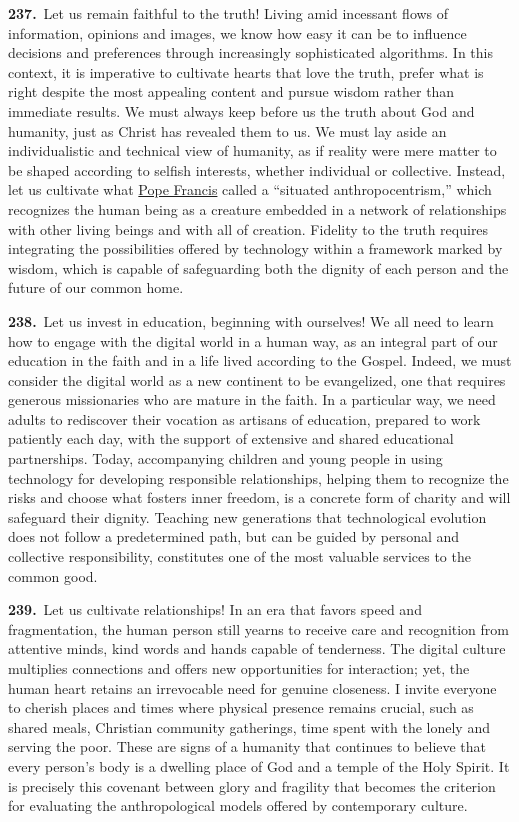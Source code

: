 \documentclass{article}
\begin{document}
\textbf{237.}\ Let us remain faithful to the truth! Living amid incessant flows of information, opinions and images, we know how easy it can be to influence decisions and preferences through increasingly sophisticated algorithms.\cite{n218} In this context, it is imperative to cultivate hearts that love the truth, prefer what is right despite the most appealing content and pursue wisdom rather than immediate results. We must always keep before us the truth about God and humanity, just as Christ has revealed them to us. We must lay aside an individualistic and technical view of humanity, as if reality were mere matter to be shaped according to selfish interests, whether individual or collective.\cite{n219} Instead, let us cultivate what \href{https://www.vatican.va/content/francesco/en.html}{Pope Francis} called a ``situated anthropocentrism,''\cite{n220} which recognizes the human being as a creature embedded in a network of relationships with other living beings and with all of creation. Fidelity to the truth requires integrating the possibilities offered by technology within a framework marked by wisdom, which is capable of safeguarding both the dignity of each person and the future of our common home.

\textbf{238.}\ Let us invest in education, beginning with ourselves! We all need to learn how to engage with the digital world in a human way, as an integral part of our education in the faith and in a life lived according to the Gospel. Indeed, we must consider the digital world as a new continent to be evangelized, one that requires generous missionaries who are mature in the faith. In a particular way, we need adults to rediscover their vocation as artisans of education, prepared to work patiently each day, with the support of extensive and shared educational partnerships. Today, accompanying children and young people in using technology for developing responsible relationships, helping them to recognize the risks and choose what fosters inner freedom, is a concrete form of charity and will safeguard their dignity. Teaching new generations that technological evolution does not follow a predetermined path, but can be guided by personal and collective responsibility, constitutes one of the most valuable services to the common good.

\textbf{239.}\ Let us cultivate relationships! In an era that favors speed and fragmentation, the human person still yearns to receive care and recognition from attentive minds, kind words and hands capable of tenderness. The digital culture multiplies connections and offers new opportunities for interaction; yet, the human heart retains an irrevocable need for genuine closeness. I invite everyone to cherish places and times where physical presence remains crucial, such as shared meals, Christian community gatherings, time spent with the lonely and serving the poor. These are signs of a humanity that continues to believe that every person's body is a dwelling place of God and a temple of the Holy Spirit. It is precisely this covenant between glory and fragility that becomes the criterion for evaluating the anthropological models offered by contemporary culture.
\end{document}
